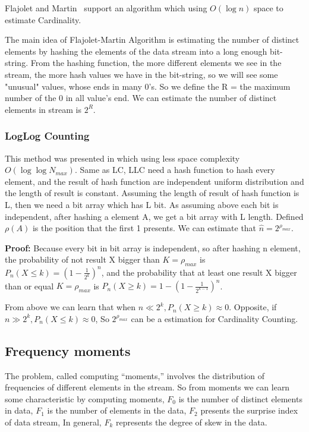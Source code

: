 \documentclass{report}
\begin{document}
Flajolet and Martin~\cite{flajolet1985probabilistic} support an algorithm which using $O(\log n)$ space to estimate Cardinality. 

The main idea of Flajolet-Martin Algorithm is estimating the number of distinct elements by hashing the elements of the data stream into a long enough bit-string. From the hashing function, the more different elements we see in the stream, the more hash values we have in the bit-string, so we will see some "unusual" values, whose ends in many 0's. So we define the R = the maximum number of the 0 in all value's end. We can estimate the number of distinct elements in stream is $2^R$.~\cite{flajolet1985probabilistic}


\subsubsection{LogLog Counting }
This method was presented in \citep{durand2003loglog} which using less space complexity $O(\log\log{N_{max}})$.
Same as LC, LLC need a hash function to hash every element, and the result of hash function are independent uniform distribution and the length of result is constant.
Assuming the length of result of hash function is L, then we need a bit array which has L bit. As assuming above each bit is independent, after hashing a element A, we get a bit array with L length. Defined $\rho(A)$ is the position that the first 1 presents. We can estimate that $\hat{n} = 2^{\rho_{max}}$.

\textbf{Proof:} Because every bit in bit array is independent, so after hashing n element, the probability of not result X bigger than $K = \rho_{max}$ is $P_n(X\leq k) = (1-\frac{1}{2^k})^n$, and the probability that at least one result X bigger than or equal $K = \rho_{max}$ is  $P_n(X\geq k) = 1-(1-\frac{1}{2^{k-1}})^n$.

From above we can learn that when $n \ll 2^k, P_n(X\geq k) \approx 0$. Opposite, if $n \gg 2^k, P_n(X\leq k) \approx 0$, So $2^{\rho_{max}}$ can be a estimation for Cardinality Counting.


\subsection{Frequency moments}

The problem, called computing “moments,” involves the distribution of frequencies of different elements in the stream. So from moments we can learn some characteristic by computing moments, $F_0$ is the number of distinct elements in data, $F_1$ is the number of elements in the data, $F_2$ presents the surprise index of data stream, In general, $F_k$ represents the degree of skew in the data.
\end{document}
